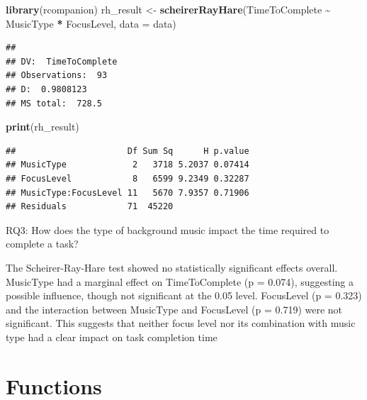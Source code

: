 \documentclass[
]{article}
\newenvironment{Shaded}{\begin{snugshade}}{\end{snugshade}}
\newcommand{\AttributeTok}[1]{\textcolor[rgb]{0.13,0.29,0.53}{#1}}
\newcommand{\FunctionTok}[1]{\textcolor[rgb]{0.13,0.29,0.53}{\textbf{#1}}}
\newcommand{\NormalTok}[1]{#1}
\newcommand{\OtherTok}[1]{\textcolor[rgb]{0.56,0.35,0.01}{#1}}
\newcommand{\SpecialCharTok}[1]{\textcolor[rgb]{0.81,0.36,0.00}{\textbf{#1}}}
\begin{document}
\begin{Shaded}
\begin{Highlighting}[]
\FunctionTok{library}\NormalTok{(rcompanion)}
\NormalTok{rh\_result }\OtherTok{\textless{}{-}} \FunctionTok{scheirerRayHare}\NormalTok{(TimeToComplete }\SpecialCharTok{\textasciitilde{}}\NormalTok{ MusicType }\SpecialCharTok{*}\NormalTok{ FocusLevel, }\AttributeTok{data =}\NormalTok{ data)}
\end{Highlighting}
\end{Shaded}

\begin{verbatim}
## 
## DV:  TimeToComplete 
## Observations:  93 
## D:  0.9808123 
## MS total:  728.5
\end{verbatim}

\begin{Shaded}
\begin{Highlighting}[]
\FunctionTok{print}\NormalTok{(rh\_result)}
\end{Highlighting}
\end{Shaded}

\begin{verbatim}
##                      Df Sum Sq      H p.value
## MusicType             2   3718 5.2037 0.07414
## FocusLevel            8   6599 9.2349 0.32287
## MusicType:FocusLevel 11   5670 7.9357 0.71906
## Residuals            71  45220
\end{verbatim}

RQ3: How does the type of background music impact the time required to
complete a task?

The Scheirer-Ray-Hare test showed no statistically significant effects
overall. MusicType had a marginal effect on TimeToComplete (p = 0.074),
suggesting a possible influence, though not significant at the 0.05
level. FocusLevel (p = 0.323) and the interaction between MusicType and
FocusLevel (p = 0.719) were not significant. This suggests that neither
focus level nor its combination with music type had a clear impact on
task completion time

\section{Functions}\label{functions}
\end{document}
